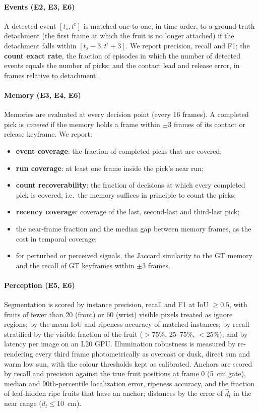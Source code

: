 \paragraph{Events (E2, E3, E6)} A detected event $[t_s, t^{\mathrm{r}}]$ is matched one-to-one, in time order, to a ground-truth detachment (the first frame at which the fruit is no longer attached) if the detachment falls within $[t_s-3, t^{\mathrm{r}}+3]$. We report precision, recall and F1; the \textbf{count exact rate}, the fraction of episodes in which the number of detected events equals the number of picks; and the contact lead and release error, in frames relative to detachment.

\paragraph{Memory (E3, E4, E6)} Memories are evaluated at every decision point (every 16 frames). A completed pick is \emph{covered} if the memory holds a frame within $\pm 3$ frames of its contact or release keyframe. We report:
\begin{itemize}
\item \textbf{event coverage}: the fraction of completed picks that are covered;
\item \textbf{run coverage}: at least one frame inside the pick's near run;
\item \textbf{count recoverability}: the fraction of decisions at which every completed pick is covered, i.e.\ the memory suffices in principle to count the picks;
\item \textbf{recency coverage}: coverage of the last, second-last and third-last pick;
\item the near-frame fraction and the median gap between memory frames, as the cost in temporal coverage;
\item for perturbed or perceived signals, the Jaccard similarity to the GT memory and the recall of GT keyframes within $\pm3$ frames.
\end{itemize}

\paragraph{Perception (E5, E6)} Segmentation is scored by instance precision, recall and F1 at IoU $\ge 0.5$, with fruits of fewer than 20 (front) or 60 (wrist) visible pixels treated as ignore regions; by the mean IoU and ripeness accuracy of matched instances; by recall stratified by the visible fraction of the fruit ($>$75\%, 25--75\%, $<$25\%); and by latency per image on an L20 GPU. Illumination robustness is measured by re-rendering every third frame photometrically as overcast or dusk, direct sun and warm low sun, with the colour thresholds kept as calibrated. Anchors are scored by recall and precision against the true fruit positions at frame 0 (5~cm gate), median and 90th-percentile localization error, ripeness accuracy, and the fraction of leaf-hidden ripe fruits that have an anchor; distances by the error of $\hat d_t$ in the near range ($d_t \le 10$~cm).

